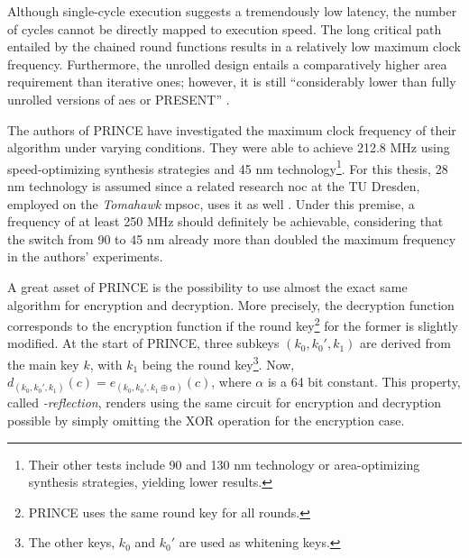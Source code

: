 Although single-cycle execution suggests a tremendously low latency, the number of cycles cannot be directly mapped to execution speed. The long critical path
entailed by the chained round functions results in a relatively low maximum clock frequency. Furthermore, the unrolled design entails a comparatively
higher area requirement than iterative ones; however, it is still \enquote{considerably lower than fully unrolled versions of \gls{aes} or PRESENT}
\cite[3]{borghoff12prince}.

The authors of PRINCE have investigated the maximum clock frequency of their algorithm under varying conditions. They were able to achieve 212.8 MHz
using speed-optimizing synthesis strategies and 45 nm technology\footnote{Their other tests include 90 and 130 nm technology or area-optimizing
synthesis strategies, yielding lower results.}. For this thesis, 28 nm technology is assumed since a related research \gls{noc} at the TU Dresden,
employed on the \textit{Tomahawk} \gls{mpsoc}, uses it as well \cite[35]{cfaedreport}. Under this premise, a frequency of at least 250 MHz should
definitely be achievable, considering that the switch from 90 to 45 nm already more than doubled the maximum frequency in the authors' experiments.

A great asset of PRINCE is the possibility to use almost the exact same algorithm for encryption and decryption. More precisely, the decryption
function corresponds to the encryption function if the round key\footnote{PRINCE uses the same round key for all rounds.} for the former is slightly
modified. At the start of PRINCE, three subkeys $(k_0, k_0', k_1)$ are derived from the main key $k$, with $k_1$ being the round key\footnote{The
other keys, $k_0$ and $k_0'$ are used as whitening keys.}. Now, $d_{(k_0, k_0', k_1)}(c) = e_{(k_0, k_0', k_1 \oplus \alpha)}(c)$, where $\alpha$ is a
64 bit constant. This property, called \textit{\alpha-reflection}, renders using the same circuit for encryption and decryption possible by simply
omitting the XOR operation for the encryption case.

